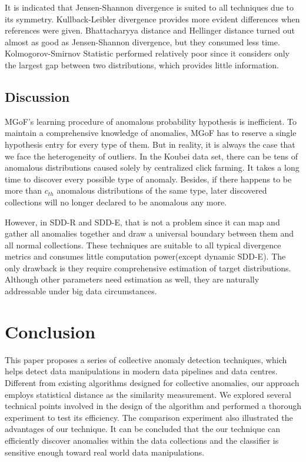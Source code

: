 \documentclass[10pt,conference,letterpaper]{article}
\begin{document}
			It is indicated that Jensen-Shannon divergence is suited to all techniques due to its symmetry. Kullback-Leibler divergence provides more evident differences when references were given. Bhattacharyya distance and Hellinger distance turned out almost as good as Jensen-Shannon divergence, but they consumed less time. Kolmogorov-Smirnov Statistic performed relatively poor since it considers only the largest gap between two distributions, which provides little information.
			
		\subsection{Discussion}
			MGoF's learning procedure of anomalous probability hypothesis is inefficient. To maintain a comprehensive knowledge of anomalies, MGoF has to reserve a single hypothesis entry for every type of them. But in reality, it is always the case that we face the heterogeneity of outliers. In the Koubei data set, there can be tens of anomalous distributions caused solely by centralized click farming. It takes a long time to discover every possible type of anomaly. Besides, if there happens to be more than $c_{th}$ anomalous distributions of the same type, later discovered collections will no longer declared to be anomalous any more.
			
			However, in SDD-R and SDD-E, that is not a problem since it can map and gather all anomalies together and draw a universal boundary between them and all normal collections. These techniques are suitable to all typical divergence metrics and consumes little computation power(except dynamic SDD-E). The only drawback is they require comprehensive estimation of target distributions. Although other parameters need estimation as well, they are naturally addressable under big data circumstances.
			
	\section{Conclusion}\label{sec:conclusion}
		This paper proposes a series of collective anomaly detection techniques, which helps detect data manipulations in modern data pipelines and data centres. Different from existing algorithms designed for collective anomalies, our approach employs statistical distance as the similarity measurement. We explored several technical points involved in the design of the algorithm and performed a thorough experiment to test its efficiency. The comparison experiment also illustrated the advantages of our technique. It can be concluded that the our technique can efficiently discover anomalies within the data collections and the classifier is sensitive enough toward real world data manipulations. 
		
\end{document}
